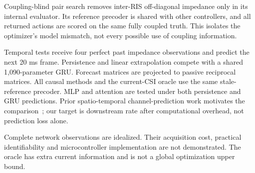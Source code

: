 \documentclass[conference]{IEEEtran}
\begin{document}
Coupling-blind pair search removes inter-RIS off-diagonal impedance only in its internal evaluator. Its reference precoder is shared with other controllers, and all returned actions are scored on the same fully coupled truth. This isolates the optimizer's model mismatch, not every possible use of coupling information.

Temporal tests receive four perfect past impedance observations and predict the next 20 ms frame. Persistence and linear extrapolation compete with a shared 1,090-parameter GRU. Forecast matrices are projected to passive reciprocal matrices. All causal methods and the current-CSI oracle use the same stale-reference precoder. MLP and attention are tested under both persistence and GRU predictions. Prior spatio-temporal channel-prediction work motivates the comparison~\cite{liu}; our target is downstream rate after computational overhead, not prediction loss alone.

Complete network observations are idealized. Their acquisition cost, practical identifiability and microcontroller implementation are not demonstrated. The oracle has extra current information and is not a global optimization upper bound.
\end{document}
